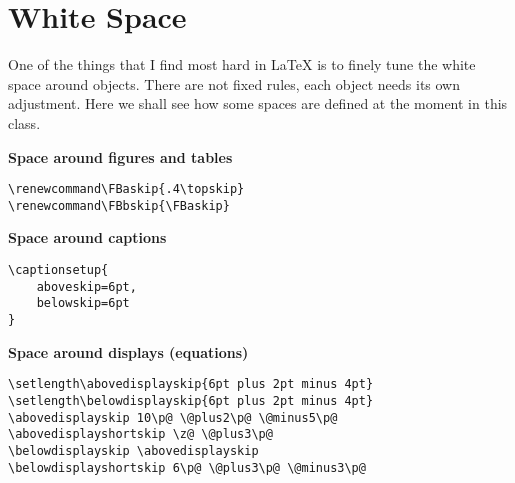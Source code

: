 \section{White Space}

One of the things that I find most hard in \LaTeX\xspace is to finely 
tune the white space around objects. There are not fixed rules, each 
object needs its own adjustment. Here we shall see how some spaces are 
defined at the moment in this class.

\textbf{Space around figures and tables}

\begin{lstlisting}[style=kaolstplain]
\renewcommand\FBaskip{.4\topskip}
\renewcommand\FBbskip{\FBaskip}
\end{lstlisting}

\textbf{Space around captions}

\begin{lstlisting}[style=kaolstplain]
\captionsetup{
	aboveskip=6pt,
	belowskip=6pt
}
\end{lstlisting}

\textbf{Space around displays (\eg equations)}

\begin{lstlisting}[style=kaolstplain]
\setlength\abovedisplayskip{6pt plus 2pt minus 4pt}
\setlength\belowdisplayskip{6pt plus 2pt minus 4pt}
\abovedisplayskip 10\p@ \@plus2\p@ \@minus5\p@
\abovedisplayshortskip \z@ \@plus3\p@
\belowdisplayskip \abovedisplayskip
\belowdisplayshortskip 6\p@ \@plus3\p@ \@minus3\p@
\end{lstlisting}
